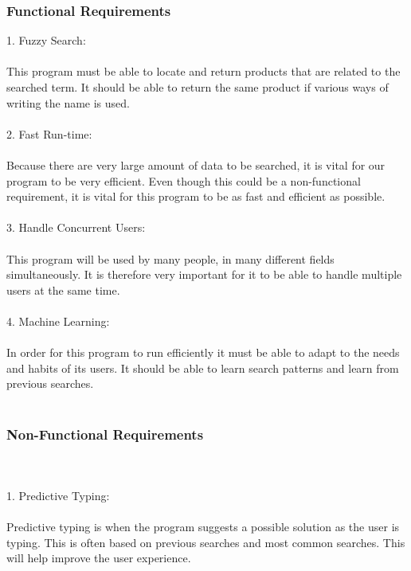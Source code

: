 \documentclass[a4paper,10pt]{article}
\begin{document}
	\subsubsection{Functional Requirements} 
	1.	Fuzzy Search:\\\\
	This program must be able to locate and return products that are related to the searched term. It should be able to return the 	same product if various ways of writing the name is used.\\\\
	
	2.	Fast Run-time:\\\\
	Because there are very large amount of data to be searched, it is vital for our program to be very efficient.  Even though this could be a non-functional requirement, it is vital for this program to be as fast and efficient as possible.\\\\
	
	3.	Handle Concurrent Users:\\\\
	This program will be used by many people, in many different fields simultaneously. It is therefore very important for it to be able to handle multiple users at the same time.\\\\
	
	4.	Machine Learning:\\\\
	In order for this program to run efficiently it must be able to adapt to the needs and habits of its users. It should be able to learn search patterns and learn from previous searches.\\\\
	
	\subsubsection{Non-Functional Requirements}\\\\
	1.	Predictive Typing:\\\\
	Predictive typing is when the program suggests a possible solution as the user is typing. This is often based on previous searches and most common searches. This will help improve the user experience. \\\\
\end{document}
